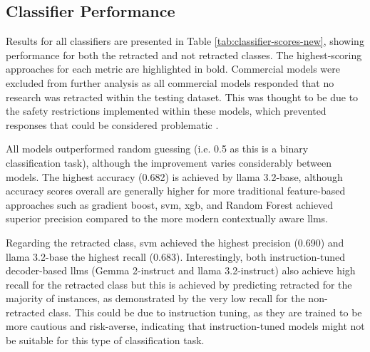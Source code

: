 \documentclass[pdflatex,sn-mathphys-num]{sn-jnl}
\begin{document}
\subsection{Classifier Performance}

Results for all classifiers are presented in Table \ref{tab:classifier-scores-new}, showing performance for both the retracted and not retracted classes. The highest-scoring approaches for each metric are highlighted in bold. Commercial models were excluded from further analysis as all commercial models responded that no research was retracted within the testing dataset. This was thought to be due to the safety restrictions implemented within these models, which prevented responses that could be considered problematic \cite{bai2022constitutionalaiharmlessnessai}.


All models outperformed random guessing (i.e. 0.5 as this is a binary classification task), although the improvement varies considerably between models. The highest accuracy (0.682) is achieved by \gls*{llama} 3.2-base, although accuracy scores overall are generally higher for more traditional feature-based approaches such as gradient boost, \gls*{svm}, \gls*{xgb}, and Random Forest achieved superior precision compared to the more modern contextually aware \glspl*{llm}.


Regarding the retracted class, \gls*{svm} achieved the highest precision (0.690) and \gls*{llama} 3.2-base the highest recall (0.683). Interestingly, both instruction-tuned decoder-based \glspl*{llm} (Gemma 2-instruct and \gls*{llama} 3.2-instruct) also achieve high recall for the retracted class but this is achieved by predicting retracted for the majority of instances, as demonstrated by the very low recall for the non-retracted class. This could be due to instruction tuning, as they are trained to be more cautious and risk-averse, indicating that instruction-tuned models might not be suitable for this type of classification task.
\end{document}

